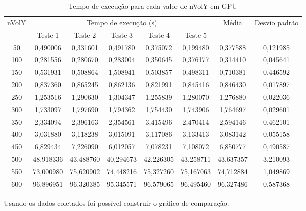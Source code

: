 \documentclass[12pt,a4paper]{article}
\begin{document}
\begin{table}[]
    \caption{Tempo de execução para cada valor de nVolY em GPU}
    \label{tab:gpu-times-table}
    \vspace{0.5cm}
    \hspace{-1.25cm}\begin{tabular}{c|c|c|c|c|c|c|c}
        \multirow{2}{*}{nVolY} & \multicolumn{5}{c}{Tempo de execução (s)} & \multirow{2}{*}{Média} & \multirow{2}{*}{Desvio padrão} \\
            & Teste 1   & Teste 2   & Teste 3   & Teste 4   & Teste 5   &           &          \\
        50  & 0,490006  & 0,331601  & 0,491780  & 0,375072  & 0,199480  & 0,377588  & 0,121985 \\
        100 & 0,281556  & 0,280670  & 0,283004  & 0,350645  & 0,376177  & 0,314410  & 0,045641 \\
        150 & 0,531931  & 0,508864  & 1,508941  & 0,503857  & 0,498311  & 0,710381  & 0,446592 \\
        200 & 0,837360  & 0,865245  & 0,862136  & 0,821991  & 0,845416  & 0,846430  & 0,017897 \\
        250 & 1,253516  & 1,290630  & 1,304347  & 1,255839  & 1,280070  & 1,276880  & 0,022036 \\
        300 & 1,733097  & 1,797690  & 1,794362  & 1,754430  & 1,743906  & 1,764697  & 0,029601 \\
        350 & 2,334094  & 2,396163  & 2,354561  & 3,415496  & 2,470414  & 2,594146  & 0,462101 \\
        400 & 3,031880  & 3,118238  & 3,015091  & 3,117086  & 3,133413  & 3,083142  & 0,055158 \\
        450 & 6,829434  & 7,226090  & 6,012057  & 7,078231  & 7,108072  & 6,850777  & 0,490587 \\
        500 & 48,918336 & 43,488760 & 40,294673 & 42,226305 & 43,258711 & 43,637357 & 3,210093 \\
        550 & 73,000980 & 75,620902 & 74,448216 & 75,327260 & 75,167063 & 74,712884 & 1,049869 \\
        600 & 96,896951 & 96,320385 & 95,345571 & 96,579065 & 96,495460 & 96,327486 & 0,587368
    \end{tabular}
\end{table}

\newpage

Usando os dados coletados foi possível construir o gráfico de comparação:
\end{document}
